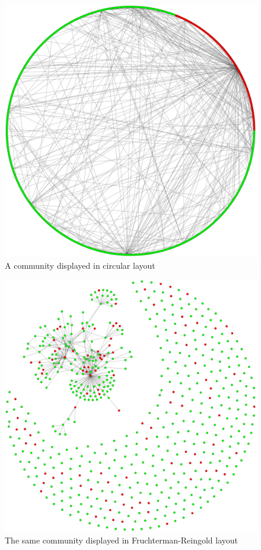 \documentclass[conference]{IEEEtran}
\begin{document}
\begin{figure}[htbp]
 \centerline{\includegraphics[width=\columnwidth]{community-circular.png}}
 \caption{A community displayed in circular layout}
\end{figure}

\begin{figure}[htbp]
 \centerline{\includegraphics[width=\columnwidth]{community_fr.png}}
 \caption{The same community displayed in Fruchterman-Reingold layout}
\end{figure}
\end{document}
